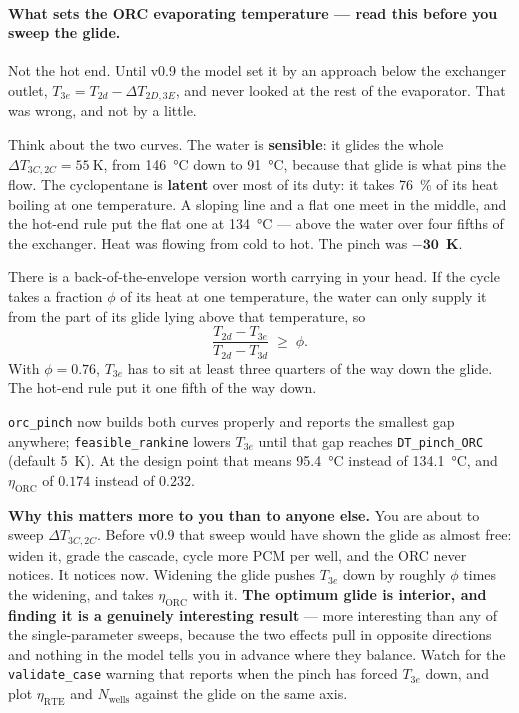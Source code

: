 \documentclass[11pt,a4paper]{article}
\providecommand{\celsius}{\degreeCelsius}
\newcommand{\Nwells}{\ensuremath{N_{\mathrm{wells}}}}
\newcommand{\code}[1]{\texttt{\small #1}}
\begin{document}
\paragraph{What sets the ORC evaporating temperature --- read this before you
sweep the glide.}
Not the hot end. Until v0.9 the model set it by an approach below the exchanger
outlet, $T_{3e}=T_{2d}-\Delta T_{2D,3E}$, and never looked at the rest of the
evaporator. That was wrong, and not by a little.

Think about the two curves. The water is \textbf{sensible}: it glides the whole
$\Delta T_{3C,2C}=\SI{55}{\kelvin}$, from \SI{146}{\celsius} down to
\SI{91}{\celsius}, because that glide is what pins the flow. The cyclopentane is
\textbf{latent} over most of its duty: it takes \SI{76}{\percent} of its heat
boiling at one temperature. A sloping line and a flat one meet in the middle,
and the hot-end rule put the flat one at \SI{134}{\celsius} --- above the water
over four fifths of the exchanger. Heat was flowing from cold to hot. The pinch
was $\mathbf{-30}$~\textbf{K}.

There is a back-of-the-envelope version worth carrying in your head. If the
cycle takes a fraction $\phi$ of its heat at one temperature, the water can only
supply it from the part of its glide lying above that temperature, so
$$\frac{T_{2d}-T_{3e}}{T_{2d}-T_{3d}} \;\ge\; \phi .$$
With $\phi=0.76$, $T_{3e}$ has to sit at least three quarters of the way down
the glide. The hot-end rule put it one fifth of the way down.

\code{orc\_pinch} now builds both curves properly and reports the smallest gap
anywhere; \code{feasible\_rankine} lowers $T_{3e}$ until that gap reaches
\code{DT\_pinch\_ORC} (default \SI{5}{\kelvin}). At the design point that means
\SI{95.4}{\celsius} instead of \SI{134.1}{\celsius}, and $\eta_{\mathrm{ORC}}$
of $0.174$ instead of $0.232$.

\medskip
\noindent\textbf{Why this matters more to you than to anyone else.} You are
about to sweep $\Delta T_{3C,2C}$. Before v0.9 that sweep would have shown the
glide as almost free: widen it, grade the cascade, cycle more PCM per well, and
the ORC never notices. It notices now. Widening the glide pushes $T_{3e}$ down
by roughly $\phi$ times the widening, and takes $\eta_{\mathrm{ORC}}$ with it.
\textbf{The optimum glide is interior, and finding it is a genuinely
interesting result} --- more interesting than any of the single-parameter
sweeps, because the two effects pull in opposite directions and nothing in the
model tells you in advance where they balance. Watch for the
\code{validate\_case} warning that reports when the pinch has forced $T_{3e}$
down, and plot $\eta_{\mathrm{RTE}}$ and $\Nwells$ against the glide on the same
axis.
\end{document}
